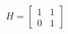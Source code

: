 \documentclass[preview]{standalone}
\begin{document}
\begin{align*}
H = \begin{bmatrix} 1 & 1 \\ 0 & 1 \end{bmatrix}
\end{align*}
\end{document}
